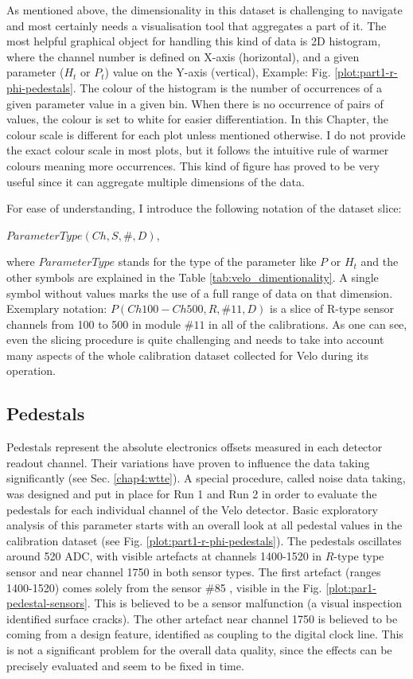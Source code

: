 As mentioned above, the dimensionality in this dataset is challenging to navigate and most certainly needs a visualisation tool that aggregates a part of it.
The most helpful graphical object for handling this kind of data is 2D histogram, where the channel number is defined on X-axis (horizontal), and a given parameter ($H_{t}$ or $P_{t}$) value on the Y-axis (vertical), Example: Fig. \ref{plot:part1-r-phi-pedestals}.
The colour of the histogram is the number of occurrences of a given parameter value in a given bin.
When there is no occurrence of pairs of values, the colour is set to white for easier differentiation.
In this Chapter, the colour scale is different for each plot unless mentioned otherwise.
I do not provide the exact colour scale in most plots, but it follows the intuitive rule of warmer colours meaning more occurrences.
This kind of figure has proved to be very useful since it can aggregate multiple dimensions of the data.

For ease of understanding, I introduce the following notation of the dataset slice: 

$ParameterType(Ch, S, \#, D)$, 

where $ParameterType$ stands for the type of the parameter like $P$ or $H_t$ and the other symbols are explained in the Table \ref{tab:velo_dimentionality}.
A single symbol without values marks the use of a full range of data on that dimension.
Exemplary notation: $P(Ch100-Ch500, R, \#11, D)$ is a slice of R-type sensor channels from 100 to 500 in module $\#11$ in all of the calibrations. As one can see, even the slicing procedure is quite challenging and needs to take into account many aspects of the whole calibration dataset collected for Velo during its operation.

\subsection{Pedestals}

Pedestals represent the absolute electronics offsets measured in each detector readout channel. Their variations have proven to influence the data taking significantly (see Sec. \ref{chap4:wtte}). A special procedure, called noise data taking, was designed and put in place for Run 1 and Run 2 in order to evaluate the pedestals for each individual channel of the Velo detector.
Basic exploratory analysis of this parameter starts with an overall look at all pedestal values in the calibration dataset (see Fig. \ref{plot:part1-r-phi-pedestals}).
The pedestals oscillates around 520 ADC, with visible artefacts at channels 1400-1520 in $R$-type type sensor and near channel 1750 in both sensor types.
The first artefact (ranges 1400-1520) comes solely from the sensor \#85
, visible in the Fig. \ref{plot:par1-pedestal-sensors}. This is believed to be a sensor malfunction (a visual inspection identified surface cracks). 
The other artefact near channel 1750 is believed to be coming from a design feature, identified as coupling to the digital clock line. 
This is not a significant problem for the overall data quality, since the effects can be precisely evaluated and seem to be fixed in time.


